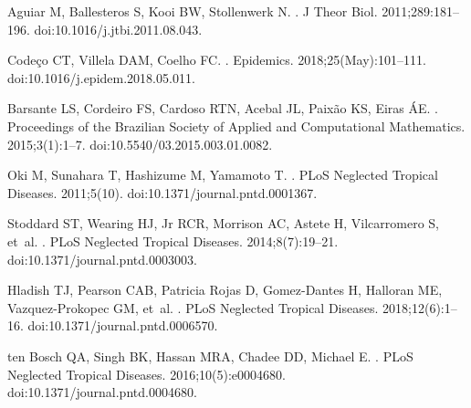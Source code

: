 \documentclass[10pt,letterpaper]{article}
\begin{document}
\begin{thebibliography}{10}
Aguiar M, Ballesteros S, Kooi BW, Stollenwerk N.
.
\newblock J Theor Biol. 2011;289:181--196.
\newblock doi:{10.1016/j.jtbi.2011.08.043}.

Code{\c{c}}o CT, Villela DAM, Coelho FC.
.
\newblock Epidemics. 2018;25(May):101--111.
\newblock doi:{10.1016/j.epidem.2018.05.011}.

Barsante LS, Cordeiro FS, Cardoso RTN, Acebal JL, Paix{\~{a}}o KS, Eiras
  {\'{A}}E.
.
\newblock Proceedings of the Brazilian Society of Applied and Computational
  Mathematics. 2015;3(1):1--7.
\newblock doi:{10.5540/03.2015.003.01.0082}.

Oki M, Sunahara T, Hashizume M, Yamamoto T.
.
\newblock PLoS Neglected Tropical Diseases. 2011;5(10).
\newblock doi:{10.1371/journal.pntd.0001367}.

Stoddard ST, Wearing HJ, Jr RCR, Morrison AC, Astete H, Vilcarromero S, et~al.
.
\newblock PLoS Neglected Tropical Diseases. 2014;8(7):19--21.
\newblock doi:{10.1371/journal.pntd.0003003}.

Hladish TJ, Pearson CAB, {Patricia Rojas} D, Gomez-Dantes H, Halloran ME,
  Vazquez-Prokopec GM, et~al.
.
\newblock PLoS Neglected Tropical Diseases. 2018;12(6):1--16.
\newblock doi:{10.1371/journal.pntd.0006570}.

ten Bosch QA, Singh BK, Hassan MRA, Chadee DD, Michael E.
.
\newblock PLoS Neglected Tropical Diseases. 2016;10(5):e0004680.
\newblock doi:{10.1371/journal.pntd.0004680}.


\end{thebibliography}
\end{document}
